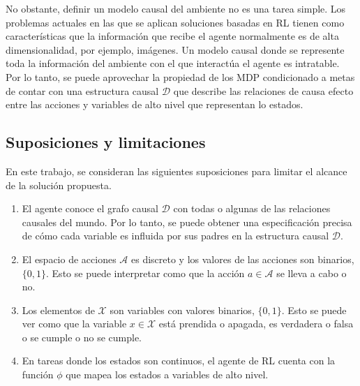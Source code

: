 No obstante, definir un modelo causal del ambiente no es una tarea simple.
Los problemas actuales en las que se aplican soluciones 
basadas en RL tienen como características que la información
que recibe el agente normalmente es de alta dimensionalidad, por 
ejemplo, imágenes. Un modelo causal donde se represente toda
la información del ambiente con el que interactúa el agente
es intratable. 
Por lo tanto, se puede aprovechar la propiedad de los MDP condicionado a metas de contar con una
estructura causal $\mathcal{D}$ que describe las relaciones de causa efecto entre las acciones 
y variables de alto nivel que representan lo estados.


\subsection{Suposiciones y limitaciones}

En este trabajo, se consideran  las siguientes suposiciones para limitar el alcance de la solución propuesta.

\begin{enumerate}
    \item El agente conoce el grafo causal $\mathcal{D}$ con todas o
    algunas de las relaciones causales del mundo.
    Por lo tanto,
se puede obtener una especificación precisa de cómo cada variable es influida por sus padres
en la estructura causal $\mathcal{D}$.
    \item El espacio de acciones $\mathcal{A}$ es discreto y los valores de las acciones son binarios, $\{0, 1\}$. Esto se puede interpretar como que la acción $a \in \mathcal{A}$ se lleva a cabo o no.
    \item Los elementos de $\mathcal{X}$ son variables con valores binarios, $\{0,1\}$. Esto se puede ver como que la variable $x\in \mathcal{X}$
    está prendida o apagada, es verdadera o falsa o se cumple o no se cumple.
    \item En tareas donde los estados son continuos, el agente de RL cuenta con la función $\phi$ que mapea los estados a variables de alto nivel.
\end{enumerate}


